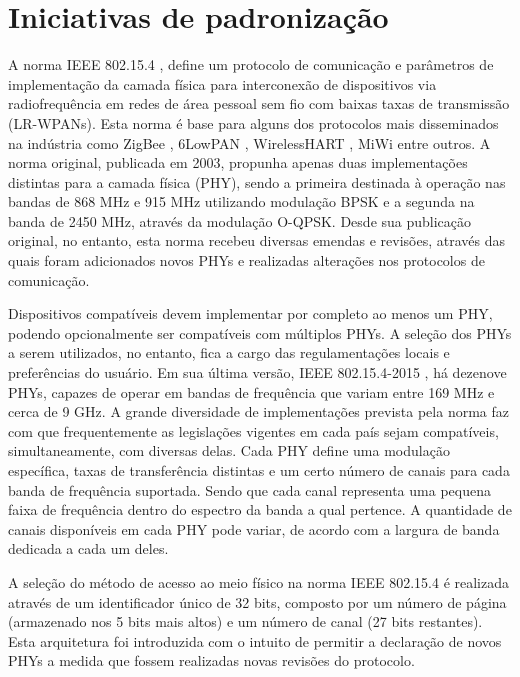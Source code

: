 \documentclass[
	12pt,				%
	openright,			%
	oneside,
	a4paper,			%
	english,			%
	french,				%
	spanish,			%
	brazil				%
	]{abntex2}
\begin{document}
\section{Iniciativas de padronização}
A norma IEEE 802.15.4 \cite{IEEE2003}, define um protocolo de comunicação e parâmetros de implementação da camada física para interconexão de dispositivos via radiofrequência em redes de área pessoal sem fio com baixas taxas de transmissão (LR-WPANs). Esta norma é base para alguns dos protocolos mais disseminados na indústria como ZigBee \cite{bibid}, 6LowPAN \cite{bibid}, WirelessHART \cite{bibid}, MiWi \cite{bibid} entre outros. A norma original, publicada em 2003, propunha apenas duas implementações distintas para a camada física (PHY), sendo a primeira destinada à operação nas bandas de 868 MHz e 915 MHz utilizando modulação BPSK e a segunda na banda de 2450 MHz, através da modulação O-QPSK. Desde sua publicação original, no entanto, esta norma recebeu diversas emendas e revisões, através das quais foram adicionados novos PHYs e realizadas alterações nos protocolos de comunicação. 

Dispositivos compatíveis devem implementar por completo ao menos um PHY, podendo opcionalmente ser compatíveis com múltiplos PHYs. A seleção dos PHYs a serem utilizados, no entanto, fica a cargo das regulamentações locais e preferências do usuário. Em sua última versão, IEEE 802.15.4-2015 \cite{IEEE2016}, há dezenove PHYs, capazes de operar em bandas de frequência que variam entre 169 MHz e cerca de 9 GHz. A grande diversidade de  implementações prevista pela norma faz com que frequentemente as legislações vigentes em cada país sejam compatíveis, simultaneamente, com diversas delas.
Cada PHY define uma modulação específica, taxas de transferência distintas e um certo número de canais para cada banda de frequência suportada. Sendo que cada canal representa uma pequena faixa de frequência dentro do espectro da banda a qual pertence. A quantidade de canais disponíveis em cada PHY pode variar, de acordo com a largura de banda dedicada a cada um deles. 

A seleção do método de acesso ao meio físico na norma IEEE 802.15.4 é realizada através de um identificador único de 32 bits, composto por um número de página (armazenado nos 5 bits mais altos) e um número de canal (27 bits restantes). Esta arquitetura foi introduzida com o intuito de permitir a declaração de novos PHYs a medida que fossem realizadas novas revisões do protocolo. 
\end{document}
